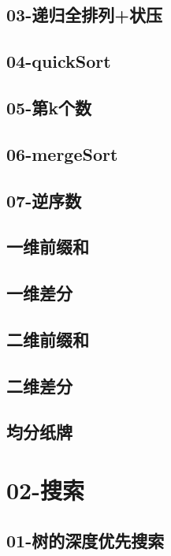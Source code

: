 \documentclass[10pt,a4paper]{article}
\begin{document}
\subsection{03-递归全排列+状压}

\subsection{04-quickSort}

\subsection{05-第k个数}

\subsection{06-mergeSort}

\subsection{07-逆序数}

\subsection{一维前缀和}

\subsection{一维差分}

\subsection{二维前缀和}

\subsection{二维差分}

\subsection{均分纸牌}

\section{02-搜索}
\subsection{01-树的深度优先搜索}

\end{document}
